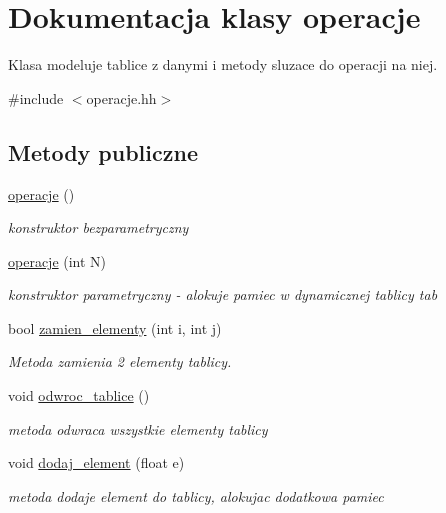 \hypertarget{classoperacje}{\section{\-Dokumentacja klasy operacje}
\label{classoperacje}
}


\-Klasa modeluje tablice z danymi i metody sluzace do operacji na niej.  




{\ttfamily \#include $<$operacje.\-hh$>$}

\subsection*{\-Metody publiczne}
\begin{DoxyCompactItemize}
\item 
\hyperlink{classoperacje_a4538e0bfde26291449dc057134b23ad8}{operacje} ()
\begin{DoxyCompactList}\small\item\em konstruktor bezparametryczny \end{DoxyCompactList}\item 
\hyperlink{classoperacje_af109f7f9a4b10334d5e8c215c7f220de}{operacje} (int \-N)
\begin{DoxyCompactList}\small\item\em konstruktor parametryczny -\/ alokuje pamiec w dynamicznej tablicy {\ttfamily tab} \end{DoxyCompactList}\item 
bool \hyperlink{classoperacje_a7393a8b3b394921a084e0c1f4ad517b7}{zamien\-\_\-elementy} (int i, int j)
\begin{DoxyCompactList}\small\item\em \-Metoda zamienia 2 elementy tablicy. \end{DoxyCompactList}\item 
void \hyperlink{classoperacje_aedc47c87f4f44f8af0cba64a940a5333}{odwroc\-\_\-tablice} ()
\begin{DoxyCompactList}\small\item\em metoda odwraca wszystkie elementy tablicy \end{DoxyCompactList}\item 
void \hyperlink{classoperacje_ad8397efded792c1381bfd0292b3e91b6}{dodaj\-\_\-element} (float e)
\begin{DoxyCompactList}\small\item\em metoda dodaje element do tablicy, alokujac dodatkowa pamiec \end{DoxyCompactList}\item 

\end{DoxyCompactItemize}
